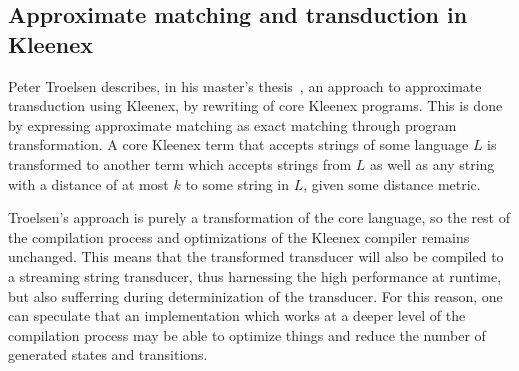 \subsection{Approximate matching and transduction in Kleenex}

Peter Troelsen describes, in his master's
thesis~\cite{troelsen2016approximate}, an approach to approximate transduction
using Kleenex, by rewriting of core Kleenex programs. This is done by
expressing approximate matching as exact matching through program
transformation. A core Kleenex term that accepts strings of some language $L$
is transformed to another term which accepts strings from $L$ as well as any
string with a distance of at most $k$ to some string in $L$, given some
distance metric.

Troelsen's approach is purely a transformation of the core language, so the
rest of the compilation process and optimizations of the Kleenex compiler
remains unchanged. This means that the transformed transducer will also be
compiled to a streaming string transducer, thus harnessing the high performance
at runtime, but also sufferring during determinization of the transducer. For
this reason, one can speculate that an implementation which works at a deeper
level of the compilation process may be able to optimize things and reduce the
number of generated states and transitions.



